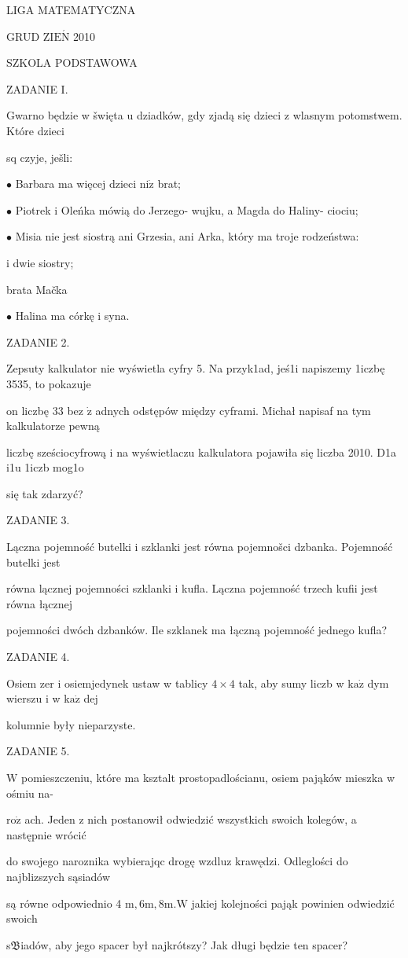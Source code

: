\documentclass[a4paper,12pt]{article}
\begin{document}
LIGA MATEMATYCZNA

GRUD Z$\mathrm{I}\mathrm{E}\acute{\mathrm{N}}$ 2010

SZKOLA PODSTAWOWA

ZADANIE I.

Gwarno będzie w šwięta $\mathrm{u}$ dziadków, gdy zjadą się dzieci z wlasnym potomstwem. Które dzieci

sq czyje, ješli:

$\bullet$ Barbara ma więcej dzieci $\mathrm{n}\mathrm{i}\dot{\mathrm{z}}$ brat;

$\bullet$ Piotrek i Oleńka mówią do Jerzego- wujku, a Magda do Haliny- ciociu;

$\bullet$ Misia nie jest siostrą ani Grzesia, ani Arka, który ma troje rodzeństwa:

i dwie siostry;

brata Mačka

$\bullet$ Halina ma córkę i syna.

ZADANIE 2.

Zepsuty kalkulator nie wyświetla cyfry 5. Na przyk1ad, jeś1i napiszemy 1iczbę 3535, to pokazuje

on liczbę 33 bez $\dot{\mathrm{z}}$ adnych odstępów między cyframi. Michał napisaf na tym kalkulatorze pewną

liczbę sześciocyfrową i na wyświetlaczu kalkulatora pojawiła się liczba 2010. D1a i1u 1iczb mog1o

się tak zdarzyć?

ZADANIE 3.

Lączna pojemność butelki i szklanki jest równa pojemnošci dzbanka. Pojemność butelki jest

równa lącznej pojemności szklanki i kufla. Lączna pojemność trzech kufii jest równa łącznej

pojemności dwóch dzbanków. Ile szklanek ma łączną pojemność jednego kufla?

ZADANIE 4.

Osiem zer i osiemjedynek ustaw w tablicy $4\times 4$ tak, aby sumy liczb w $\mathrm{k}\mathrm{a}\dot{\mathrm{z}}$ dym wierszu i w $\mathrm{k}\mathrm{a}\dot{\mathrm{z}}$ dej

kolumnie były nieparzyste.

ZADANIE 5.

$\mathrm{W}$ pomieszczeniu, które ma ksztalt prostopadlościanu, osiem pająków mieszka w ośmiu na-

$\mathrm{r}\mathrm{o}\dot{\mathrm{z}}$ ach. Jeden z nich postanowił odwiedzić wszystkich swoich kolegów, a następnie wrócić

do swojego naroznika wybierajqc drogę wzdluz krawędzi. Odleglości do najblizszych sąsiadów

są równe odpowiednio 4 $\mathrm{m}, 6\mathrm{m}, 8\mathrm{m}. \mathrm{W}$ jakiej kolejności pająk powinien odwiedzić swoich

s$\mathfrak{B}$iadów, aby jego spacer był najkrótszy? Jak długi będzie ten spacer?
\end{document}
